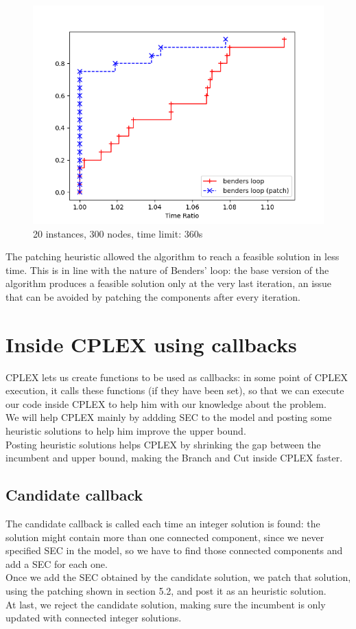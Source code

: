 \FloatBarrier
\begin{figure}[h]
    \centering
    \includegraphics*[width=.6\textwidth]{../plots/perfprof_benders_times.png}
    \caption*{20 instances, 300 nodes, time limit: 360s}
\end{figure}
\FloatBarrier

The patching heuristic allowed the algorithm to reach a feasible solution in less time. This is in line with the nature of Benders' loop: the base version of the algorithm produces a feasible solution only at the very last iteration, an issue that can be avoided by patching the components after every iteration.

\section{Inside CPLEX using callbacks}

CPLEX lets us create functions to be used as callbacks: in some point of CPLEX execution, it calls these functions (if they have been set), so that we can execute our code inside CPLEX to help him with our knowledge about the problem.\\
We will help CPLEX mainly by addding SEC to the model and posting some heuristic solutions to help him improve the upper bound.\\
Posting heuristic solutions helps CPLEX by shrinking the gap between the incumbent and upper bound, making the Branch and Cut inside CPLEX faster.

\subsection{Candidate callback}
The candidate callback is called each time an integer solution is found: the solution might contain more than one connected component, since we never specified SEC in the model, so we have to find those connected components and add a SEC for each one.\\
Once we add the SEC obtained by the candidate solution, we patch that solution, using the patching shown in section 5.2, and post it as an heuristic solution.\\
At last, we reject the candidate solution, making sure the incumbent is only updated with connected integer solutions.

